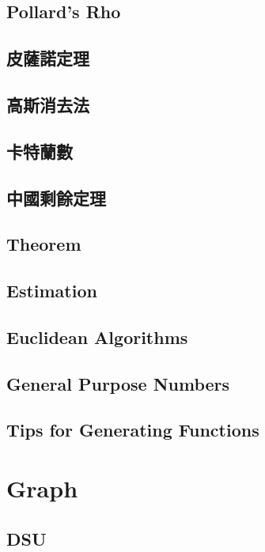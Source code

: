 \subsection{Pollard's Rho} 

\subsection{皮薩諾定理} 

\subsection{高斯消去法}

\subsection{卡特蘭數}

\subsection{中國剩餘定理}

\subsection{Theorem}

\subsection{Estimation}

\subsection{Euclidean Algorithms}

\subsection{General Purpose Numbers}

\subsection{Tips for Generating Functions}


\section{Graph}
\subsection{DSU} 

